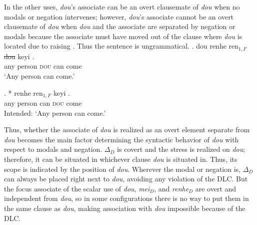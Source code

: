 \documentclass[12pt]{article}
\let\latextextsubscript\textsubscript
\let\textsubscript\latextextsubscript
\newcommand{\gap}[1]{\rule{1em}{0.4pt}\textsubscript{#1}}
\begin{document}
%
%
In the other uses, \emph{dou}'s associate can be an overt clausemate of \emph{dou} when no modals or negation intervenes; however,
\emph{dou}'s associate cannot be an overt clausemate of \emph{dou} when \emph{dou} and the associate are separated by negation or modals because the associate must have moved out of the clause where \emph{dou} is located due to raising \NNext.
Thus the sentence is ungrammatical.
\ex. \gll
dou renhe ren\(_{1, F}\) \sout{dou} keyi \I[CP \gap{1} lai ]. \\
{} any person \textsc{dou} can {} {} come \\
\glt `Any person can come.'

\ex. * \gll
renhe ren\(_{1, F}\) keyi \I[CP dou \gap{1} \sout{dou} lai ]. \\
any person can {} {} {} \textsc{dou} come \\
\glt Intended: `Any person can come.'

%
%

Thus, whether the associate of \emph{dou} is realized as an overt element separate from \emph{dou} becomes the main factor determining the syntactic behavior of \emph{dou} with respect to modals and negation.
\(\Delta_D\) is covert and the stress is realized on \emph{dou}; therefore, it can be situated in whichever clause \emph{dou} is situated in.
Thus, its scope is indicated by the position of \emph{dou}.
Wherever the modal or negation is, \(\Delta_D\) can always be placed right next to \emph{dou}, avoiding any violation of the DLC.
But the focus associate of the scalar use of \emph{dou}, \emph{mei}\(_D\), and \emph{renhe}\(_D\) are overt and independent from \emph{dou}, so in some configurations there is no way to put them in the same clause as \emph{dou}, making association with \emph{dou} impossible because of the DLC.
\end{document}
